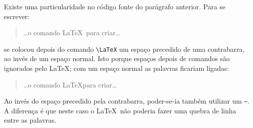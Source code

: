 Existe uma particularidade no código fonte do parágrafo anterior. Para
se escrever:
\begin{quotation}
\dots o comando \LaTeX\ para criar\dots
\end{quotation}
se colocou depois do comando \verb|\LaTeX| um espaço
precedido de uma contrabarra, ao invés de um espaço normal. Isto porque
espaços depois de comandos são ignorados pelo \LaTeX; com um espaço
normal as palavras ficariam ligadas:
\begin{quotation}
\dots o comando \LaTeX para criar\dots
\end{quotation}
Ao invés do espaço precedido pela contrabarra, poder-se-ia também
utilizar um \texttt{\~{}}. A diferença é que neste caso o \LaTeX\ não
poderia fazer uma quebra de linha entre as palavras.
